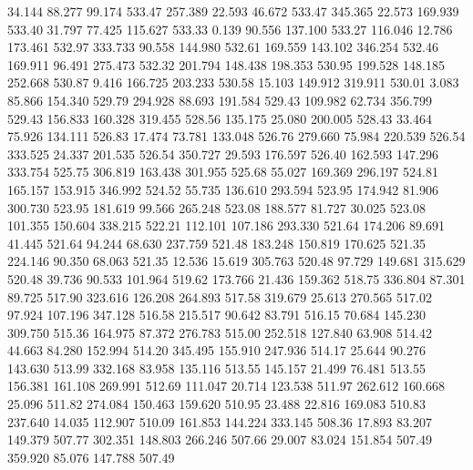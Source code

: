   34.144   88.277   99.174       533.47
 257.389   22.593   46.672       533.47
 345.365   22.573  169.939       533.40
  31.797   77.425  115.627       533.33
   0.139   90.556  137.100       533.27
 116.046   12.786  173.461       532.97
 333.733   90.558  144.980       532.61
 169.559  143.102  346.254       532.46
 169.911   96.491  275.473       532.32
 201.794  148.438  198.353       530.95
 199.528  148.185  252.668       530.87
   9.416  166.725  203.233       530.58
  15.103  149.912  319.911       530.01
   3.083   85.866  154.340       529.79
 294.928   88.693  191.584       529.43
 109.982   62.734  356.799       529.43
 156.833  160.328  319.455       528.56
 135.175   25.080  200.005       528.43
  33.464   75.926  134.111       526.83
  17.474   73.781  133.048       526.76
 279.660   75.984  220.539       526.54
 333.525   24.337  201.535       526.54
 350.727   29.593  176.597       526.40
 162.593  147.296  333.754       525.75
 306.819  163.438  301.955       525.68
  55.027  169.369  296.197       524.81
 165.157  153.915  346.992       524.52
  55.735  136.610  293.594       523.95
 174.942   81.906  300.730       523.95
 181.619   99.566  265.248       523.08
 188.577   81.727   30.025       523.08
 101.355  150.604  338.215       522.21
 112.101  107.186  293.330       521.64
 174.206   89.691   41.445       521.64
  94.244   68.630  237.759       521.48
 183.248  150.819  170.625       521.35
 224.146   90.350   68.063       521.35
  12.536   15.619  305.763       520.48
  97.729  149.681  315.629       520.48
  39.736   90.533  101.964       519.62
 173.766   21.436  159.362       518.75
 336.804   87.301   89.725       517.90
 323.616  126.208  264.893       517.58
 319.679   25.613  270.565       517.02
  97.924  107.196  347.128       516.58
 215.517   90.642   83.791       516.15
  70.684  145.230  309.750       515.36
 164.975   87.372  276.783       515.00
 252.518  127.840   63.908       514.42
  44.663   84.280  152.994       514.20
 345.495  155.910  247.936       514.17
  25.644   90.276  143.630       513.99
 332.168   83.958  135.116       513.55
 145.157   21.499   76.481       513.55
 156.381  161.108  269.991       512.69
 111.047   20.714  123.538       511.97
 262.612  160.668   25.096       511.82
 274.084  150.463  159.620       510.95
  23.488   22.816  169.083       510.83
 237.640   14.035  112.907       510.09
 161.853  144.224  333.145       508.36
  17.893   83.207  149.379       507.77
 302.351  148.803  266.246       507.66
  29.007   83.024  151.854       507.49
 359.920   85.076  147.788       507.49
